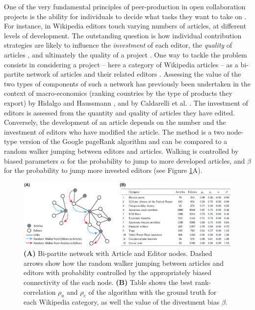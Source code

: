 \documentclass[letterpaper,10pt,a4paper]{article}
\begin{document}
%
One of the very fundamental principles of peer-production in open collaboration projects is the ability for individuals to decide what tasks they want to 
take on \cite{benkler2002}. For instance, in Wikipedia editors touch varying numbers of articles, at different levels of development. The outstanding question is how individual contribution strategies are likely to influence the {\it investment} of each editor, the {\it quality} of articles \cite{wang}, and ultimately the quality of a project \cite{geiger2013}. One way to tackle the problem consists in considering a project -- here a category of Wikipedia articles -- as a bi-partite network of articles and their related editors \cite{jesus2009}. Assessing the value of the two types of components of such a network has previously been undertaken in the context of macro-economics (ranking countries by the type of products they export) by Hidalgo and Haussmann \cite{hidalgo2009}, and by Caldarelli et al. \cite{caldarelli2012network}. The investment of editors is assessed from the quantity and quality of articles they have edited. Conversely, the development of an article depends on the number and the investment of editors who have modified the article. The method is a two node-type version of the Google pageRank algorithm \cite{page1999pagerank} and can be compared to a random walker jumping between editors and articles. Walking is controlled by biased parameters $\alpha$ for the probability to jump to more developed articles, and $\beta$ for the probability to jump more invested editors (see Figure \ref{fig1}A). 
\begin{figure}[h]
\centering
\includegraphics[width=0.8\columnwidth]{Figures/figure_abstract.eps}
\caption{{\bf (A)} Bi-partite network with Article and Editor nodes. Dashed arrows show how the random walker jumping between articles and editors with  probability controlled by the appropriately biased connectivity of the each node. {\bf (B)} Table shows the best rank-correlation $\rho_a$ and $\rho_e$ of the algorithm with the ground truth for each Wikipedia category, as well the value of the divestment bias $\beta$.}
\label{fig1}
\end{figure}
\end{document}

